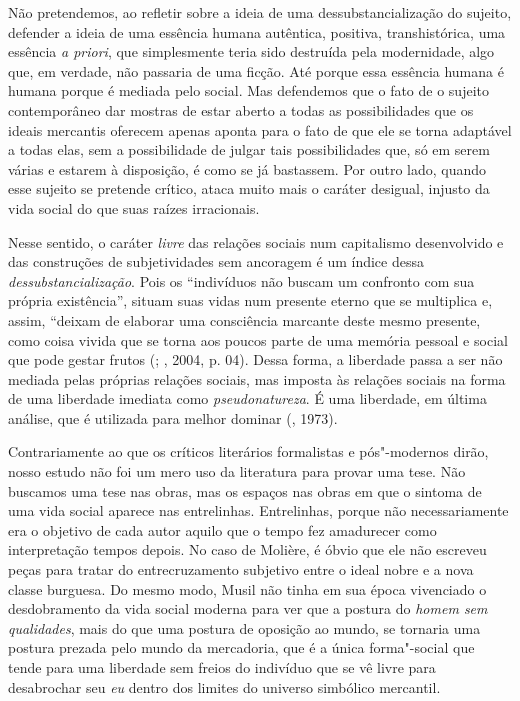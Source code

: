 {Não pretendemos, ao refletir sobre a ideia de uma dessubstancialização
do sujeito, defender a ideia de uma essência humana autêntica, positiva,
transhistórica, uma essência \emph{a priori}, que simplesmente teria
sido destruída pela modernidade, algo que, em verdade, não passaria de
uma ficção. Até porque essa essência humana é humana porque é mediada
pelo social. Mas defendemos que o fato de o sujeito contemporâneo dar
mostras de estar aberto a todas as possibilidades que os ideais
mercantis oferecem apenas aponta para o fato de que ele se torna
adaptável a todas elas, sem a possibilidade de julgar tais
possibilidades que, só em serem várias e estarem à disposição, é como se
já bastassem. Por outro lado, quando esse sujeito se pretende crítico,
ataca muito mais o caráter desigual, injusto da vida social do que suas
raízes irracionais.

Nesse sentido, o caráter \emph{livre} das relações sociais num
capitalismo desenvolvido e das construções de subjetividades sem
ancoragem é um índice dessa \emph{dessubstancialização}. Pois os
``indivíduos não buscam um confronto com sua própria existência'',
situam suas vidas num presente eterno que se multiplica e, assim,
``deixam de elaborar uma consciência marcante deste mesmo presente, como
coisa vivida que se torna aos poucos parte de uma memória pessoal e
social que pode gestar frutos (; , 2004, p. 04). Dessa forma,
a liberdade passa a ser não mediada pelas próprias relações sociais, mas
imposta às relações sociais na forma de uma liberdade imediata como
\emph{pseudonatureza}. É uma liberdade, em última análise, que é
utilizada para melhor dominar (, 1973).

Contrariamente ao que os críticos literários formalistas e pós"-modernos
dirão, nosso estudo não foi um mero uso da literatura para provar uma
tese. Não buscamos uma tese nas obras, mas os espaços nas obras em que o
sintoma de uma vida social aparece nas entrelinhas. Entrelinhas, porque
não necessariamente era o objetivo de cada autor aquilo que o tempo fez
amadurecer como interpretação tempos depois. No caso de Molière, é óbvio
que ele não escreveu peças para tratar do entrecruzamento subjetivo
entre o ideal nobre e a nova classe burguesa. Do mesmo modo, Musil não
tinha em sua época vivenciado o desdobramento da vida social moderna
para ver que a postura do \emph{homem sem qualidades}, mais do que uma
postura de oposição ao mundo, se tornaria uma postura prezada pelo mundo
da mercadoria, que é a única forma"-social que tende para uma liberdade
sem freios do indivíduo que se vê livre para desabrochar seu \emph{eu}
dentro dos limites do universo simbólico mercantil.

}
